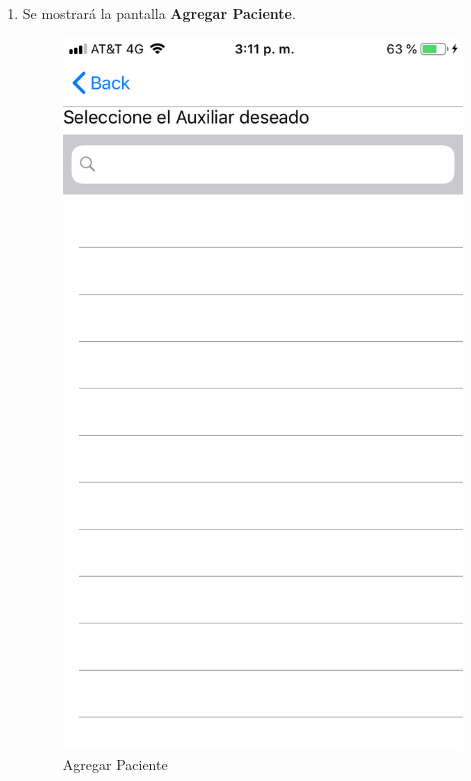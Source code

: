 \begin{enumerate}
	\item Se mostrará la pantalla \textbf{Agregar Paciente}.
	\newpage
	\begin{figure}[!htbp]			
		\hypertarget{fig:AgregarPaciente}{\hspace{1pt}}
		\begin{center}
			\includegraphics[height=0.4\textheight]{Paciente/AgregarAuxiliar/images/AgregarAuxiliar}
			\caption{Agregar Paciente}
			\label{fig:AgregarPaciente}
		\end{center}
	\end{figure}
	

\end{enumerate}
